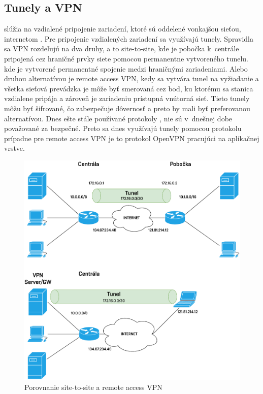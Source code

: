 \subsection{Tunely a VPN}
 slúžia na vzdialené pripojenie zariadení, ktoré sú oddelené vonkajšou sieťou, internetom \cite{Lammle2013}. Pre pripojenie vzdialených zariadení sa využívajú tunely. Spravidla sa VPN rozdeľujú na dva druhy, a to site-to-site, kde je pobočka k~centrále pripojená cez hraničné prvky siete pomocou permanentne vytvoreného tunelu.  kde je vytvorené permanentné spojenie medzi hraničnými zariadeniami. Alebo druhou alternatívou je remote access VPN, kedy sa vytvára tunel na vyžiadanie a všetka sieťová prevádzka je môže byť smerovaná cez bod, ku ktorému sa stanica vzdialene pripája a zároveň je zariadeniu prístupná vnútorná sieť. Tieto tunely môžu byť šifrované, čo zabezpečuje dôvernosť a preto by mali byť preferovanou alternatívou. Dnes ešte stále používané protokoly ,  nie sú v~dnešnej dobe považované za bezpečné. Preto sa dnes využívajú tunely pomocou protokolu  prípadne pre remote access VPN je to protokol OpenVPN pracujúci na aplikačnej vrstve.

\begin{figure}[H]
	\begin{center}
		\includegraphics[scale=0.6]{obrazky/tunnels.pdf}
	\end{center}
	\caption[Porovnanie site-to-site a remote access VPN]{Porovnanie site-to-site a remote access VPN}
	\label{fig:tunnel}
\end{figure} 



